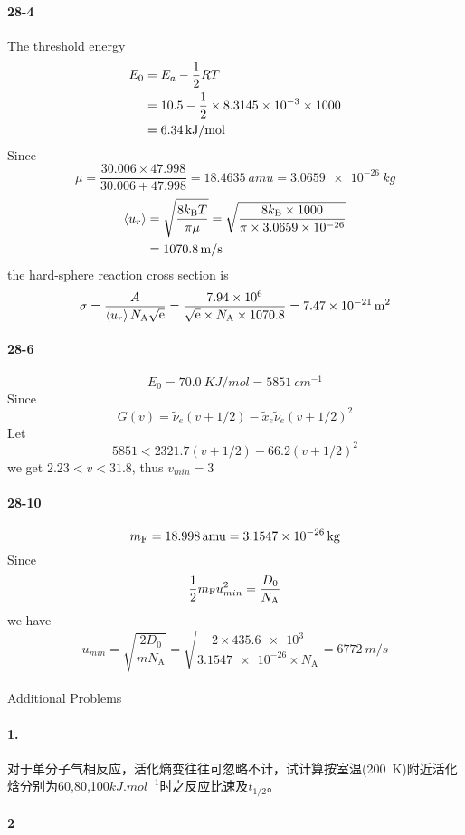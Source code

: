 \documentclass[a4paper]{article}
\DeclareMathOperator{\e}{\mathrm{e}}
\newcommand{\NA}{N_\mathrm{A}}
\newcommand{\kB}{k_\mathrm{B}}
\newcommand{\ex}[1]{\paragraph{#1}}
\numberwithin{equation}{section}
\begin{document}
\ex{28-4}
The threshold energy
\begin{align}
E_0 &= E_a - \dfrac{1}{2}RT \notag\\
&= 10.5 - \dfrac{1}{2}\times \num{8.3145e-3}\times 1000 \notag\\
&= \SI{6.34}{kJ/mol} 
\end{align}
Since %
\begin{equation}\label{key}
\mu = \dfrac{30.006\times 47.998}{30.006 + 47.998} = \SI{18.4635}{amu} = \SI{3.0659e-26}{kg}
\end{equation}
\begin{align}
\ev{u_r} &= \sqrt{\dfrac{8\kB T}{\pi \mu}} = \sqrt{\dfrac{8\kB \times 1000}{\pi \times \num{3.0659e-26}}} \notag\\
&= \SI{1070.8}{m/s}
\end{align}
the hard-sphere reaction cross section is
\begin{equation}\label{key}
\sigma = \dfrac{A}{\ev{u_r}\NA \sqrt{\e}} = \dfrac{\num{7.94e6}}{\sqrt{\e}\times \NA \times 1070.8} = \SI{7.47e-21}{m^2}
\end{equation}

\ex{28-6}
\begin{equation}\label{key}
E_0 = \SI{70.0}{KJ/mol} = \SI{5851}{cm^{-1}}
\end{equation}
Since 
\begin{equation}\label{key}
G(v) = \tilde{\nu}_e(v + 1/2) - \tilde{x}_e\tilde{\nu}_e(v+1/2)^2
\end{equation}
Let
\begin{equation}\label{key}
5851 < 2321.7(v+1/2) - 66.2(v+1/2)^2
\end{equation}
we get
$ 2.23 < v < 31.8 $, thus $ v_{min} = 3 $


\ex{28-10}
\begin{equation}\label{key}
m_{\ce{F}} = \SI{18.998}{amu} = \SI{3.1547e-26}{kg}
\end{equation}
Since
\begin{equation}\label{key}
\dfrac{1}{2}m_{\ce{F}} u_{min}^2 = \dfrac{D_0}{\NA}
\end{equation}
we have
\begin{equation}\label{key}
u_{min} = \sqrt{\dfrac{2 D_0}{m\NA}} = \sqrt{\dfrac{2\times \num{435.6e3}}{\num{3.1547e-26}\times \NA}} = \SI{6772}{m/s}
\end{equation}
\vspace{10pt}~\\


Additional Problems\\
\ex{1.} 对于单分子气相反应，活化熵变往往可忽略不计，试计算按室温(\SI{200}{K})附近活化焓分别为60,80,100$ \si{kJ.mol^{-1}} $时之反应比速及$ t_{1/2} $。


\ex{2}
\end{document}
